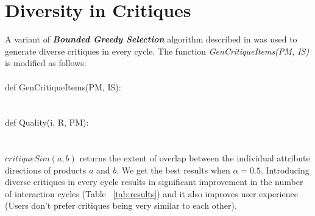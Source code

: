 \section{Diversity in Critiques}

A variant of \textit{\textbf{Bounded Greedy Selection}} algorithm described in \cite{boundedGreedy} was used to generate diverse critiques in every cycle.
The function \textit{GenCritiqueItems(PM, IS)} is modified as follows:\\
\\
def GenCritiqueItems(PM, IS):\\
\noindent{}
\\
\\
def Quality(i, R, PM):\\
\noindent{}
\\
\\
$critiqueSim(a, b)$ returns the extent of overlap between the individual attribute directions of products $a$ and $b$.
We get the best results when $\alpha = 0.5$.
Introducing diverse critiques in every cycle results in significant improvement in the number of interaction cycles (Table ~\ref{tab:results}) and it also improves user experience (Users don't prefer critiques being very similar to each other).


